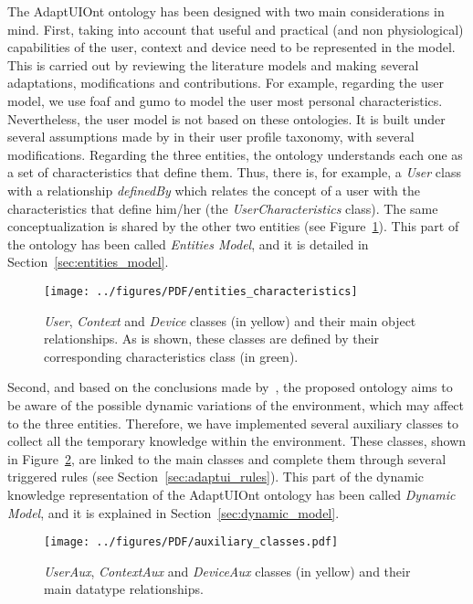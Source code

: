 The AdaptUIOnt ontology has been designed with two main considerations in mind.
First, taking into account that useful and practical (and non physiological)
capabilities of the user, context and device need to be represented in the model.
This is carried out by reviewing the literature models and making several
adaptations, modifications and contributions. For example, regarding the user
model, we use \ac{foaf} and \ac{gumo} to
model the user most personal characteristics. Nevertheless, the user model is
not based on these ontologies. It is built under several assumptions made by
\citet{casas_user_2008} in their user profile taxonomy, with several modifications.
Regarding the three entities, the ontology understands each one as a set of
characteristics that define them. Thus, there is, for example, a \textit{User}
class with a relationship \textit{definedBy} which relates the concept of a user
with the characteristics that define him/her (the \textit{UserCharacteristics}
class). The same conceptualization is shared by the other two entities (see
Figure~\ref{fig:entities_characteristics}). This part of the ontology has been
called \textit{Entities Model}, and it is detailed in Section~\ref{sec:entities_model}.



\begin{figure}
\centering
\texttt{[image: ../figures/PDF/entities\_characteristics]}
\caption{\textit{User},
\textit{Context} and \textit{Device} classes (in yellow) and their main object
relationships. As is shown, these classes are defined by their corresponding
characteristics class (in green).}
\label{fig:entities_characteristics}
\end{figure}


Second, and based on the conclusions made by~\citet{gregor_designing_2002},
the proposed ontology aims to be aware of the possible dynamic variations of the
environment, which may affect to the three entities. Therefore, we have implemented
several auxiliary classes to collect all the temporary knowledge within the
environment. These classes, shown in Figure~\ref{fig:auxiliary_classes}, are
linked to the main classes and complete them through several triggered rules
(see Section~\ref{sec:adaptui_rules}). This part of the dynamic knowledge
representation of the AdaptUIOnt ontology has been called \textit{Dynamic Model},
and it is explained in Section~\ref{sec:dynamic_model}.


\begin{figure}
\centering
\texttt{[image: ../figures/PDF/auxiliary\_classes.pdf]}
\caption{\textit{UserAux}, \textit{ContextAux} and \textit{DeviceAux} classes
(in yellow) and their main datatype relationships.}
\label{fig:auxiliary_classes}
\end{figure}

